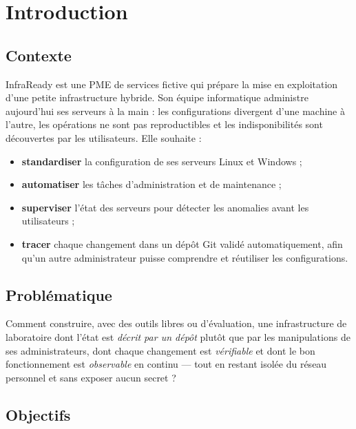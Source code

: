 \chapter{Introduction}\label{chap:introduction}

\section{Contexte}

InfraReady est une PME de services fictive qui prépare la mise en exploitation d'une petite
infrastructure hybride. Son équipe informatique administre aujourd'hui ses serveurs à la main :
les configurations divergent d'une machine à l'autre, les opérations ne sont pas reproductibles et
les indisponibilités sont découvertes par les utilisateurs. Elle souhaite :
\begin{itemize}
  \item \textbf{standardiser} la configuration de ses serveurs Linux et Windows ;
  \item \textbf{automatiser} les tâches d'administration et de maintenance ;
  \item \textbf{superviser} l'état des serveurs pour détecter les anomalies avant les utilisateurs ;
  \item \textbf{tracer} chaque changement dans un dépôt Git validé automatiquement, afin qu'un autre
        administrateur puisse comprendre et réutiliser les configurations.
\end{itemize}

\section{Problématique}

Comment construire, avec des outils libres ou d'évaluation, une infrastructure de laboratoire dont
l'état est \emph{décrit par un dépôt} plutôt que par les manipulations de ses administrateurs, dont
chaque changement est \emph{vérifiable} et dont le bon fonctionnement est \emph{observable} en
continu — tout en restant isolée du réseau personnel et sans exposer aucun secret ?

\section{Objectifs}

